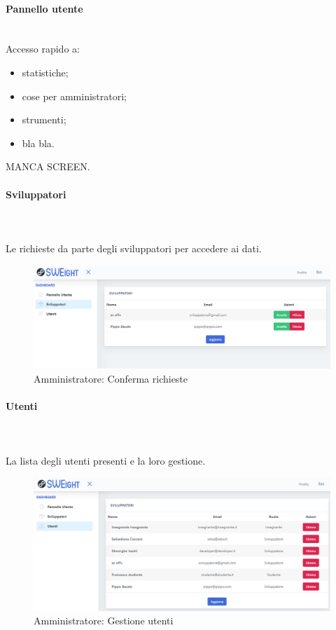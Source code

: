 	 \paragraph{Pannello utente}\mbox{}\\
Accesso rapido a:
\begin{itemize}
	\item statistiche;
	\item cose per amministratori;
	\item strumenti;
	\item bla bla.
\end{itemize}  MANCA SCREEN.
\paragraph{Sviluppatori}\mbox{}\\ \\
Le richieste da parte degli sviluppatori per accedere ai dati.
\begin{figure}[H]
	\centering
	\includegraphics[width=17cm]{sez/img/amministratore/conf_ric_svil.png}
	\caption{Amministratore: Conferma richieste}\label{fig:1}
\end{figure}
\paragraph{Utenti}\mbox{}\\ \\
La lista degli utenti presenti e la loro gestione.
\begin{figure}[H]
	\centering
	\includegraphics[width=17cm]{sez/img/amministratore/gestisciutenti.png}
	\caption{Amministratore: Gestione utenti}\label{fig:1}
\end{figure}
